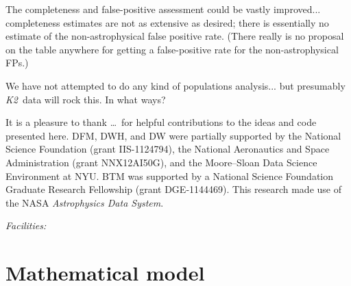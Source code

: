 \documentclass[12pt,preprint]{aastex}
\newcommand{\project}[1]{\textsl{#1}} %
\newcommand{\KT}{\project{K2}}
\newcommand{\sectlabel}[1]{\label{sect:#1}}
\begin{document}
The completeness and false-positive assessment could be vastly improved...
completeness estimates are not as extensive as desired;
there is essentially no estimate of the non-astrophysical false positive rate.
(There really is no proposal on the table anywhere for getting a false-positive
rate for the non-astrophysical FPs.)

We have not attempted to do any kind of populations analysis...
but presumably \KT\ data will rock this.  In what ways?

\acknowledgments
It is a pleasure to thank
\ldots\
for helpful contributions to the ideas and code presented here.
DFM, DWH, and DW were partially supported by the National Science Foundation (grant IIS-1124794),
the National Aeronautics and Space Administration
(grant NNX12AI50G), and the Moore--Sloan Data Science Environment at NYU.
BTM was supported by a National Science Foundation Graduate Research
Fellowship (grant DGE‐1144469).
This research made use of the NASA \project{Astrophysics Data System}.

{\it Facilities:} 

\appendix

\section{Mathematical model}
\sectlabel{math}
\end{document}
